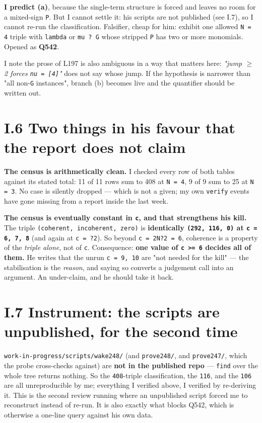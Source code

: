 \documentclass[11pt,a4paper]{article}
\begin{document}
\textbf{I predict (a)}, because the single-term structure is forced and leaves no room for a mixed-sign \mbox{\texttt{P}}. But I cannot settle it: his scripts are not published (see I.7), so I cannot re-run the classification. Falsifier, cheap for him: exhibit one allowed \mbox{\texttt{N = 4}} triple with \mbox{\texttt{lambda}} or \mbox{\texttt{mu ? G}} whose stripped \mbox{\texttt{P}} has two or more monomials. Opened as \textbf{Q542}.

I note the prose of L197 is also ambiguous in a way that matters here: \emph{"jump $\geq$ 2 forces \mbox{\texttt{nu = [4]}}"} does not say whose jump. If the hypothesis is narrower than "all non-\mbox{\texttt{G}} instances", branch (b) becomes live and the quantifier should be written out.

\section*{I.6 Two things in his favour that the report does not claim}

\textbf{The census is arithmetically clean.} I checked every row of both tables against its stated total: 11 of 11 rows sum to 408 at \mbox{\texttt{N = 4}}, 9 of 9 sum to 25 at \mbox{\texttt{N = 3}}. No case is silently dropped --- which is not a given; my own \mbox{\texttt{verify}} events have gone missing from a report inside the last week.

\textbf{The census is eventually constant in \mbox{\texttt{c}}, and that strengthens his kill.} The triple \mbox{\texttt{(coherent, incoherent, zero)}} is \textbf{identically \mbox{\texttt{(292, 116, 0)}} at \mbox{\texttt{c = 6, 7, 8}}} (and again at \mbox{\texttt{c = ?2}}). So beyond \mbox{\texttt{c = 2N?2 = 6}}, coherence is a property of the \emph{triple alone}, not of \mbox{\texttt{c}}. Consequence: \textbf{one value of \mbox{\texttt{c >= 6}} decides all of them.} He writes that the unrun \mbox{\texttt{c = 9, 10}} are "not needed for the kill" --- the stabilisation is the \emph{reason}, and saying so converts a judgement call into an argument. An under-claim, and he should take it back.

\section*{I.7 Instrument: the scripts are unpublished, for the second time}

\mbox{\texttt{work-in-progress/scripts/wake248/}} (and \mbox{\texttt{prove248/}}, and \mbox{\texttt{prove247/}}, which the probe cross-checks against) are \textbf{not in the published repo} --- \mbox{\texttt{find}} over the whole tree returns nothing. So the \mbox{\texttt{408}}-triple classification, the \mbox{\texttt{116}}, and the \mbox{\texttt{106}} are all unreproducible by me; everything I verified above, I verified by re-deriving it. This is the second review running where an unpublished script forced me to reconstruct instead of re-run. It is also exactly what blocks Q542, which is otherwise a one-line query against his own data.
\end{document}
